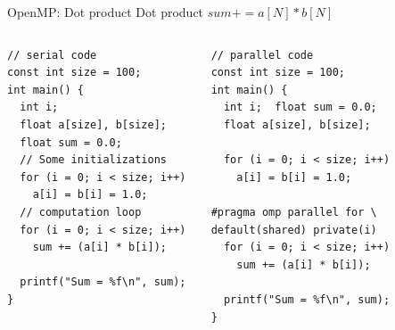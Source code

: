 \documentclass[10pt,times]{beamer}
\begin{document}
\begin{frame}[fragile]{OpenMP: Dot product}
Dot product $sum += a[N] * b[N]$
\begin{columns}
\begin{verbatim}
// serial code
const int size = 100;
int main() {
  int i;
  float a[size], b[size];
  float sum = 0.0;
  // Some initializations
  for (i = 0; i < size; i++) 
    a[i] = b[i] = 1.0;
  // computation loop
  for (i = 0; i < size; i++) 
    sum += (a[i] * b[i]);

  printf("Sum = %f\n", sum);
}
\end{verbatim}
\begin{verbatim}
// parallel code
const int size = 100;
int main() {
  int i;  float sum = 0.0;
  float a[size], b[size];

  for (i = 0; i < size; i++) 
    a[i] = b[i] = 1.0;

#pragma omp parallel for \
default(shared) private(i) 
  for (i = 0; i < size; i++) 
    sum += (a[i] * b[i]);

  printf("Sum = %f\n", sum);
}  
\end{verbatim}
\end{columns}
\end{frame}
\end{document}
